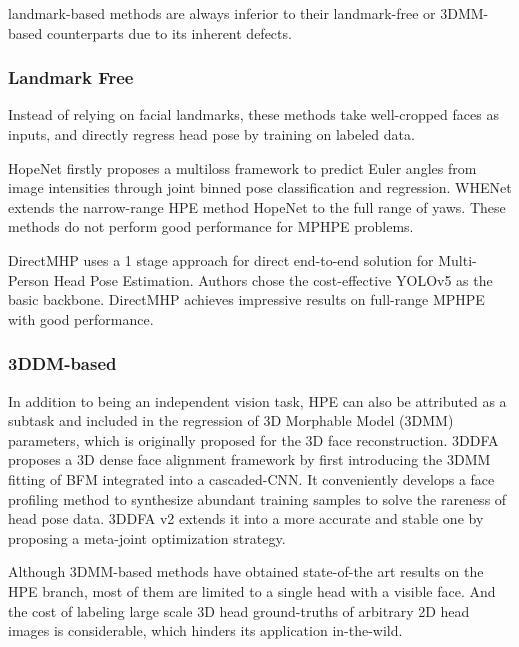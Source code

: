 landmark-based methods are always inferior to their landmark-free or 3DMM-based counterparts due to its inherent defects.

\subsubsection{Landmark Free}
Instead of relying on facial landmarks, these methods take well-cropped faces as inputs, and directly regress head pose by training on labeled data.

HopeNet \cite{Chong2018finegrained} firstly proposes a multiloss framework to predict Euler angles from image intensities through joint binned pose classification and regression.  WHENet \cite{whenet2020} extends the narrow-range HPE method HopeNet \cite{Chong2018finegrained} to the full range of yaws. These methods do not perform good performance for MPHPE problems.

DirectMHP \cite{zhou2023directmhp} uses a 1 stage approach for direct end-to-end solution for Multi-Person Head Pose Estimation. Authors chose the cost-effective YOLOv5 as the basic backbone. DirectMHP \cite{zhou2023directmhp} achieves impressive results on full-range MPHPE with good performance.

\subsubsection{3DDM-based}
In addition to being an independent vision task, HPE can also be attributed as a subtask and included in the regression of 3D Morphable Model (3DMM) parameters, which is originally proposed for the 3D face reconstruction.
3DDFA \cite{facealign3d2016} proposes a 3D dense face alignment framework by first introducing the 3DMM fitting of BFM \cite{facemodel3d2009} integrated into a cascaded-CNN. It conveniently develops a face profiling method to synthesize abundant training samples to solve the rareness of head pose data. 3DDFA v2 \cite{facealign3d2020} extends it into a more accurate and stable one by proposing a meta-joint optimization strategy.

Although 3DMM-based methods have obtained state-of-the art results on the HPE branch, most of them are limited to a single head with a visible face. And the cost of labeling large scale 3D head ground-truths of arbitrary 2D head images is considerable, which hinders its application in-the-wild.


